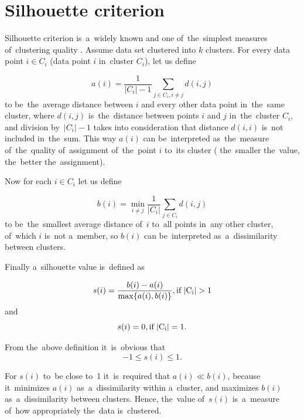 \section{Silhouette criterion}\label{app_sil}

Silhouette criterion is~a~widely known and one of~the~simplest measures of~clustering quality \cite{rousseeuw1987silhouettes}. Assume data set clustered into $k$ clusters. For every data point $i \in C_i$ (data point $i$ in~cluster $C_i$), let us define

\begin{equation}
  a(i)=\frac{1}{|C_i|-1}\sum_{j\in C_i, i\neq j}d(i,j)
\end{equation}
to be~the~average distance between $i$ and every other data point in~the~same cluster, where $d(i,j)$ is~the~distance between points $i$ and $j$ in~the~cluster $C_i$, and division by~$|C_i|-1$ takes into consideration that distance $d(i,i)$ is~not included in~the~sum. This way $a(i)$ can be~interpreted as~the~measure of~the~quality of~assignment of~the~point $i$ to~its cluster ( the~smaller the~value, the~better the~assignment).

Now for each $i \in C_i$ let us define

\begin{equation}
  b(i)=\min_{i\neq j}\frac{1}{|C_i|}\sum_{j\in C_i}d(i,j)
\end{equation}
to be~the~smallest average distance of~$i$ to~all points in~any other cluster, of~which $i$ is~not a~member, so $b(i)$ can be~interpreted as~a~dissimilarity between clusters.

Finally a~silhouette value is~defined as

\begin{equation}
  s(i)=\frac{b(i)-a(i)}{\max\{a(i),b(i) \}}, \rm{if}\: |C_i|>1
\end{equation}
and
\begin{equation}
  s(i)=0, \rm{if}\: |C_i|=1.
\end{equation}

From the~above definition it~is~obvious that 
\begin{equation}
  -1\leq s(i)\leq 1.
\end{equation}

For $s(i)$ to~be close to~1 it~is~required that $a(i)\ll b(i)$, because it~minimizes $a(i)$ as~a~dissimilarity within a~cluster, and maximizes $b(i)$ as~a~dissimilarity between clusters. Hence, the~value of~$s(i)$ is~a~measure of~how appropriately the~data is~clustered.


